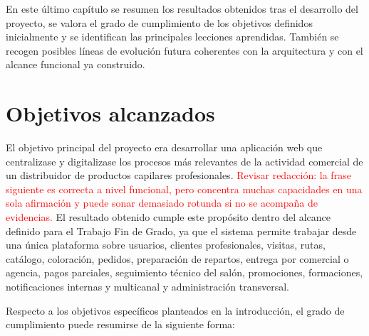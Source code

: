 En este último capítulo se resumen los resultados obtenidos tras el desarrollo del proyecto, se valora el grado de cumplimiento de los objetivos definidos inicialmente y se identifican las principales lecciones aprendidas. También se recogen posibles líneas de evolución futura coherentes con la arquitectura y con el alcance funcional ya construido.

\section{Objetivos alcanzados}

El objetivo principal del proyecto era desarrollar una aplicación web que centralizase y digitalizase los procesos más relevantes de la actividad comercial de un distribuidor de productos capilares profesionales. \textcolor{red}{Revisar redacción: la frase siguiente es correcta a nivel funcional, pero concentra muchas capacidades en una sola afirmación y puede sonar demasiado rotunda si no se acompaña de evidencias.} El resultado obtenido cumple este propósito dentro del alcance definido para el Trabajo Fin de Grado, ya que el sistema permite trabajar desde una única plataforma sobre usuarios, clientes profesionales, visitas, rutas, catálogo, coloración, pedidos, preparación de repartos, entrega por comercial o agencia, pagos parciales, seguimiento técnico del salón, promociones, formaciones, notificaciones internas y multicanal y administración transversal.

Respecto a los objetivos específicos planteados en la introducción, el grado de cumplimiento puede resumirse de la siguiente forma:

